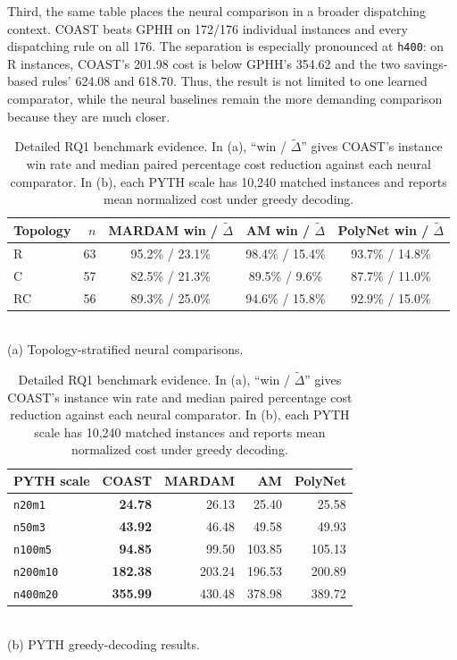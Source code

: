 \documentclass[letterpaper]{article}
\begin{document}
Third, the same table places the neural comparison in a broader dispatching context. COAST beats GPHH on 172/176 individual instances and every dispatching rule on all 176. The separation is especially pronounced at \texttt{h400}: on R instances, COAST's 201.98 cost is below GPHH's 354.62 and the two savings-based rules' 624.08 and 618.70. Thus, the result is not limited to one learned comparator, while the neural baselines remain the more demanding comparison because they are much closer.

\begin{table}[t]
\centering
\begin{minipage}[t]{0.47\textwidth}
\centering
{\small
\setlength{\tabcolsep}{3.0pt}
\begin{tabular}{lrccc}
\toprule
Topology & $n$ & \shortstack{MARDAM\\win / $\tilde{\Delta}$} & \shortstack{AM\\win / $\tilde{\Delta}$} & \shortstack{PolyNet\\win / $\tilde{\Delta}$} \\
\midrule
R  & 63 & 95.2\% / 23.1\% & 98.4\% / 15.4\% & 93.7\% / 14.8\% \\
C  & 57 & 82.5\% / 21.3\% & 89.5\% / 9.6\%  & 87.7\% / 11.0\% \\
RC & 56 & 89.3\% / 25.0\% & 94.6\% / 15.8\% & 92.9\% / 15.0\% \\
\bottomrule
\end{tabular}
}\\[1pt]
\footnotesize (a) Topology-stratified neural comparisons.
\end{minipage}\hfill
\begin{minipage}[t]{0.47\textwidth}
\centering
{\small
\setlength{\tabcolsep}{4.5pt}
\begin{tabular}{lrrrr}
\toprule
PYTH scale & COAST & MARDAM & AM & PolyNet \\
\midrule
\texttt{n20m1} & \textbf{24.78} & 26.13 & 25.40 & 25.58 \\
\texttt{n50m3}             & \textbf{43.92} & 46.48 & 49.58 & 49.93 \\
\texttt{n100m5}            & \textbf{94.85} & 99.50 & 103.85 & 105.13 \\
\texttt{n200m10}           & \textbf{182.38} & 203.24 & 196.53 & 200.89 \\
\texttt{n400m20}           & \textbf{355.99} & 430.48 & 378.98 & 389.72 \\
\bottomrule
\end{tabular}
}\\[1pt]
\footnotesize (b) PYTH greedy-decoding results.
\end{minipage}
\caption{Detailed RQ1 benchmark evidence. In (a), ``win / $\tilde{\Delta}$'' gives COAST's instance win rate and median paired percentage cost reduction against each neural comparator. In (b), each PYTH scale has 10,240 matched instances and reports mean normalized cost under greedy decoding.}
\label{tab:rq1_detail}
\end{table}
\end{document}
